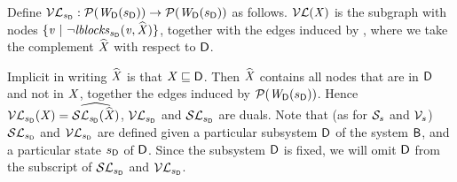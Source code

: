 \begin{definition}[$\lVFsymb$] \label{defn:violFixLoc}
Define $\lVFsymb_{\sD}: \lwfgS{B}{\sD}{\DS}  \to  \lwfgS{B}{\sD}{\DS}$ as follows.
$\lVF{\XS}$ is the subgraph with nodes $\set{\ndv \stt \neg \lblocks{\sD}{\ndv}{\complLoc{\XS}} }$, together with the edges induced by ,
where we take the complement $\complLoc{\XS}$ with respect to $\DS$.
\end{definition}
%
Implicit in writing $\complLoc{\XS}$ is that $\XS \subg \DS$. Then  $\complLoc{\XS}$ contains all nodes that are in $\DS$ and not in $\XS$, together 
the edges induced by $\lwfgS{B}{\sD}{\DS}$.
%
Hence $\lVFs{\sD}{\XS} = \complLoc{\lSFs{\sD}{\complLoc{\XS}}}$, \ie $\lVFsymb_{\sD}$ and $\lSFsymb_{\sD}$ are duals.
Note that (as for $\SFsymb_s$ and $\VFsymb_s$) $\lSFsymb_{\sD}$ and $\lVFsymb_{\sD}$ are defined given a particular
subsystem $\DS$ of the system 
$\B$, and a particular state $\sD$ of $\DS$. 
Since the subsystem $\DS$ is fixed, we will omit $\DS$ from the subscript of $\lSFsymb_{\sD}$ and $\lVFsymb_{\sD}$.




